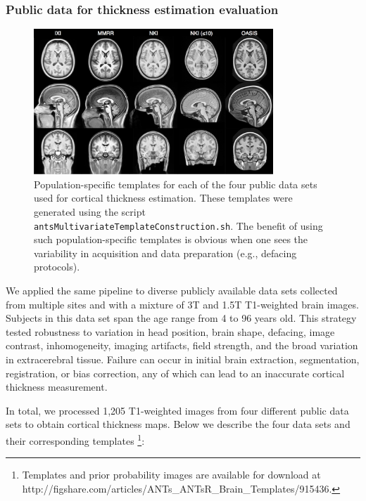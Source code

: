 \subsubsection{Public data for thickness estimation evaluation}

\begin{figure}
  \centering
  \includegraphics[width=90mm]{Figures/templates.jpg}
  \caption{Population-specific templates for each of the four public data sets used
  for cortical thickness 
  estimation. These templates were generated using the script {\tt antsMultivariateTemplateConstruction.sh}.
  The benefit of using such population-specific templates is obvious when one sees the variability in
  acquisition and data preparation (e.g., defacing protocols).
  }
  \label{fig:template}
\end{figure}

We applied the same pipeline to diverse publicly available data sets collected
from multiple sites and with a mixture of 3T and
1.5T T1-weighted brain images.  Subjects in this data set  
span the age range from 4 to 96 years old.  This strategy tested robustness to
variation in head position, brain shape, defacing, image contrast, inhomogeneity, imaging
artifacts, field strength, and the broad variation in extracerebral tissue.  Failure
can occur in initial brain extraction, segmentation, registration, or
bias correction, any of which can lead to an inaccurate cortical
thickness measurement.                           

In total, we processed 1,205 T1-weighted images from four different
public data sets to obtain cortical thickness maps.
Below we describe the four data sets and their corresponding
templates%
\footnote
{
Templates and prior probability images are available for download at
http://figshare.com/articles/ANTs\_ANTsR\_Brain\_Templates/915436.
}:
                                          
